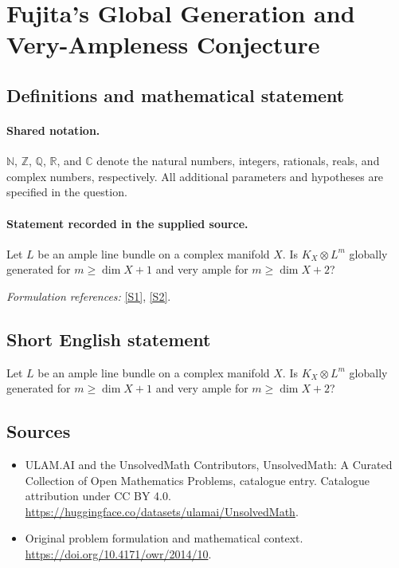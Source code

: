 \documentclass[11pt]{article}
\newcommand{\sref}[2]{\hyperlink{source:#1:#2}{[S#2]}}
\begin{document}
\section{Fujita's Global Generation and Very-Ampleness Conjecture}\label{statement}

\subsection{Definitions and mathematical statement}

\paragraph{Shared notation.}$\mathbb N$, $\mathbb Z$, $\mathbb Q$, $\mathbb R$, and $\mathbb C$ denote the natural numbers, integers, rationals, reals, and complex numbers, respectively. All additional parameters and hypotheses are specified in the question.


\paragraph{Statement recorded in the supplied source.}
Let $L$ be an ample line bundle on a complex manifold $X$. Is $K_X\otimes L^m$ globally generated for $m\geq\dim X+1$ and very ample for $m\geq\dim X+2$?
\par\smallskip\textit{Formulation references:} \sref{statement}{1}, \sref{statement}{2}.
\subsection{Short English statement}
Let $L$ be an ample line bundle on a complex manifold $X$. Is $K_X\otimes L^m$ globally generated for $m\geq\dim X+1$ and very ample for $m\geq\dim X+2$?
\subsection{Sources}
\begin{itemize}
\item[\hypertarget{source:statement:1}{S1}] ULAM.AI and the UnsolvedMath Contributors, UnsolvedMath: A Curated Collection of Open Mathematics Problems, catalogue entry. Catalogue attribution under CC BY 4.0.
\url{https://huggingface.co/datasets/ulamai/UnsolvedMath}.
\item[\hypertarget{source:statement:2}{S2}] Original problem formulation and mathematical context.
\url{https://doi.org/10.4171/owr/2014/10}.
\end{itemize}
\label{end:statement}
\end{document}
